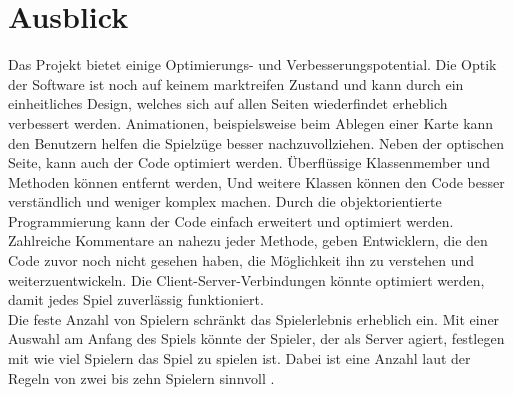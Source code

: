 \chapter{Ausblick}
Das Projekt bietet einige Optimierungs- und Verbesserungspotential. Die Optik der Software ist noch auf keinem marktreifen Zustand und kann durch ein einheitliches Design, welches sich auf allen Seiten wiederfindet erheblich verbessert werden. Animationen, beispielsweise beim Ablegen einer Karte kann den Benutzern helfen die Spielzüge besser nachzuvollziehen. Neben der optischen Seite, kann auch der Code optimiert werden. Überflüssige Klassenmember und Methoden können entfernt werden, Und weitere Klassen können den Code besser verständlich und weniger komplex machen. Durch die objektorientierte Programmierung kann der Code einfach erweitert und optimiert werden. Zahlreiche Kommentare an nahezu jeder Methode, geben Entwicklern, die den Code zuvor noch nicht gesehen haben, die Möglichkeit ihn zu verstehen und weiterzuentwickeln. Die Client-Server-Verbindungen könnte optimiert werden, damit jedes Spiel zuverlässig funktioniert.\\
Die feste Anzahl von Spielern schränkt das Spielerlebnis erheblich ein. Mit einer Auswahl am Anfang des Spiels könnte der Spieler, der als Server agiert, festlegen mit wie viel Spielern das Spiel zu spielen ist. Dabei ist eine Anzahl laut der Regeln von zwei bis zehn Spielern sinnvoll \cite{Mattel}.